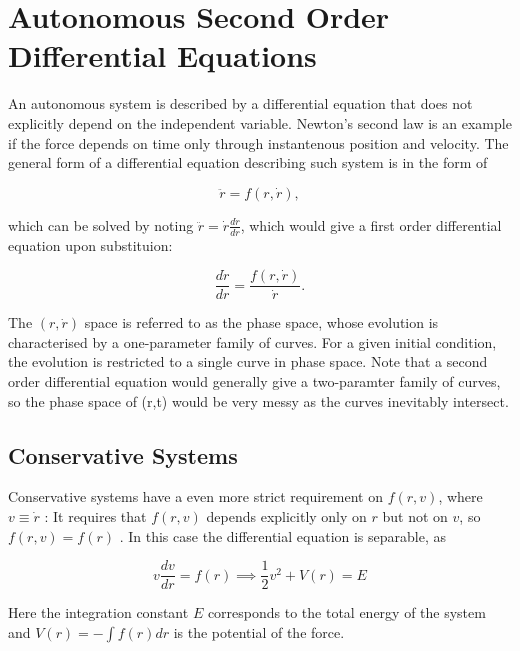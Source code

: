 \documentclass[english,a4paper,12pt]{report}
\begin{document}







\chapter{Autonomous Second Order Differential Equations}

An autonomous system is described by a differential equation that does not explicitly depend on the independent variable. Newton's second law is an example if the force depends on time only through instantenous position and velocity. The general form of a differential equation describing such system is in the form of 

\begin{equation}
    \ddot{r} = f(r,\dot{r} ),
\end{equation}

which can be solved by noting \(\ddot{r} = \dot{r} \frac{d \dot{r} }{dr}  \), which would give a first order differential equation upon substituion:

\begin{equation}
    \frac{d \dot{r} }{dr} = \frac{f(r,\dot{r} )}{\dot{r} } .
\end{equation}

The \((r,\dot{r} )\) space is referred to as the phase space, whose evolution is characterised by a one-parameter family of curves. For a given initial condition, the evolution is restricted to a single curve in phase space. Note that a second order differential equation would generally give a two-paramter family of curves, so the phase space of (r,t) would be very messy as the curves inevitably intersect.

\section{Conservative Systems}

Conservative systems have a even more strict requirement on \(f(r,v)\), where \(v \equiv \dot{r} \) : It requires that \(f(r,v)\) depends explicitly only on \(r\) but not on \(v\), so \(f(r,v) = f(r)\) . In this case the differential equation is separable, as

\begin{equation}
    v\frac{dv}{dr} = f(r) \implies \frac{1}{2} v^2+ V(r) = E
\end{equation}

Here the integration constant \(E\) corresponds to the total energy of the system and \(V(r) = - \int f(r)dr\) is the potential of the force. 
\end{document}

